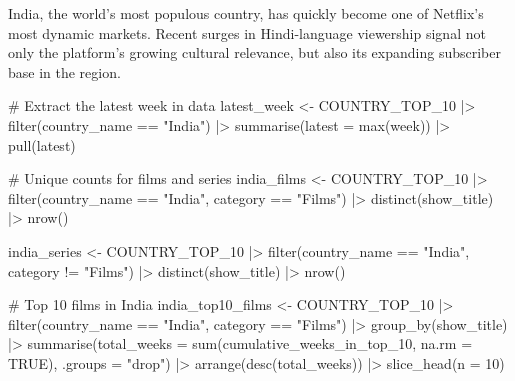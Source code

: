 \documentclass[
  12pt,
  letterpaper,
  DIV=11,
  numbers=noendperiod]{scrartcl}
\newenvironment{Shaded}{\begin{snugshade}}{\end{snugshade}}
\newcommand{\AttributeTok}[1]{\textcolor[rgb]{0.40,0.45,0.13}{#1}}
\newcommand{\CommentTok}[1]{\textcolor[rgb]{0.37,0.37,0.37}{#1}}
\newcommand{\ConstantTok}[1]{\textcolor[rgb]{0.56,0.35,0.01}{#1}}
\newcommand{\DecValTok}[1]{\textcolor[rgb]{0.68,0.00,0.00}{#1}}
\newcommand{\FunctionTok}[1]{\textcolor[rgb]{0.28,0.35,0.67}{#1}}
\newcommand{\NormalTok}[1]{\textcolor[rgb]{0.00,0.23,0.31}{#1}}
\newcommand{\OtherTok}[1]{\textcolor[rgb]{0.00,0.23,0.31}{#1}}
\newcommand{\SpecialCharTok}[1]{\textcolor[rgb]{0.37,0.37,0.37}{#1}}
\newcommand{\StringTok}[1]{\textcolor[rgb]{0.13,0.47,0.30}{#1}}
\begin{document}
India, the world's most populous country, has quickly become one of
Netflix's most dynamic markets. Recent surges in Hindi-language
viewership signal not only the platform's growing cultural relevance,
but also its expanding subscriber base in the region.

\begin{Shaded}
\begin{Highlighting}[]
\CommentTok{\# Extract the latest week in data}
\NormalTok{latest\_week }\OtherTok{\textless{}{-}}\NormalTok{ COUNTRY\_TOP\_10 }\SpecialCharTok{|\textgreater{}}
  \FunctionTok{filter}\NormalTok{(country\_name }\SpecialCharTok{==} \StringTok{"India"}\NormalTok{) }\SpecialCharTok{|\textgreater{}}
  \FunctionTok{summarise}\NormalTok{(}\AttributeTok{latest =} \FunctionTok{max}\NormalTok{(week)) }\SpecialCharTok{|\textgreater{}}
  \FunctionTok{pull}\NormalTok{(latest)}

\CommentTok{\# Unique counts for films and series}
\NormalTok{india\_films }\OtherTok{\textless{}{-}}\NormalTok{ COUNTRY\_TOP\_10 }\SpecialCharTok{|\textgreater{}}
  \FunctionTok{filter}\NormalTok{(country\_name }\SpecialCharTok{==} \StringTok{"India"}\NormalTok{, category }\SpecialCharTok{==} \StringTok{"Films"}\NormalTok{) }\SpecialCharTok{|\textgreater{}}
  \FunctionTok{distinct}\NormalTok{(show\_title) }\SpecialCharTok{|\textgreater{}}
  \FunctionTok{nrow}\NormalTok{()}

\NormalTok{india\_series }\OtherTok{\textless{}{-}}\NormalTok{ COUNTRY\_TOP\_10 }\SpecialCharTok{|\textgreater{}}
  \FunctionTok{filter}\NormalTok{(country\_name }\SpecialCharTok{==} \StringTok{"India"}\NormalTok{, category }\SpecialCharTok{!=} \StringTok{"Films"}\NormalTok{) }\SpecialCharTok{|\textgreater{}}
  \FunctionTok{distinct}\NormalTok{(show\_title) }\SpecialCharTok{|\textgreater{}}
  \FunctionTok{nrow}\NormalTok{()}

\CommentTok{\# Top 10 films in India}
\NormalTok{india\_top10\_films }\OtherTok{\textless{}{-}}\NormalTok{ COUNTRY\_TOP\_10 }\SpecialCharTok{|\textgreater{}}
  \FunctionTok{filter}\NormalTok{(country\_name }\SpecialCharTok{==} \StringTok{"India"}\NormalTok{, category }\SpecialCharTok{==} \StringTok{"Films"}\NormalTok{) }\SpecialCharTok{|\textgreater{}}
  \FunctionTok{group\_by}\NormalTok{(show\_title) }\SpecialCharTok{|\textgreater{}}
  \FunctionTok{summarise}\NormalTok{(}\AttributeTok{total\_weeks =} \FunctionTok{sum}\NormalTok{(cumulative\_weeks\_in\_top\_10, }\AttributeTok{na.rm =} \ConstantTok{TRUE}\NormalTok{), }\AttributeTok{.groups =} \StringTok{"drop"}\NormalTok{) }\SpecialCharTok{|\textgreater{}}
  \FunctionTok{arrange}\NormalTok{(}\FunctionTok{desc}\NormalTok{(total\_weeks)) }\SpecialCharTok{|\textgreater{}}
  \FunctionTok{slice\_head}\NormalTok{(}\AttributeTok{n =} \DecValTok{10}\NormalTok{)}


\end{Highlighting}
\end{Shaded}
\end{document}
